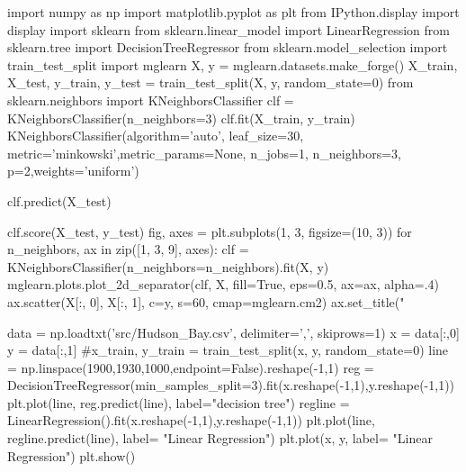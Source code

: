\documentclass[%
oneside,                 %
final,                   %
10pt]{article}
\begin{document}
\bpycod
import numpy as np
import matplotlib.pyplot as plt
from IPython.display import display
import sklearn
from sklearn.linear_model import LinearRegression
from sklearn.tree import DecisionTreeRegressor
from sklearn.model_selection import train_test_split
import mglearn
X, y = mglearn.datasets.make_forge()
X_train, X_test, y_train, y_test = train_test_split(X, y, random_state=0)
from sklearn.neighbors import KNeighborsClassifier
clf = KNeighborsClassifier(n_neighbors=3)
clf.fit(X_train, y_train)
KNeighborsClassifier(algorithm='auto', leaf_size=30, metric='minkowski',metric_params=None, n_jobs=1, n_neighbors=3, p=2,weights='uniform')

clf.predict(X_test)

clf.score(X_test, y_test)
fig, axes = plt.subplots(1, 3, figsize=(10, 3))
for n_neighbors, ax in zip([1, 3, 9], axes):
        clf = KNeighborsClassifier(n_neighbors=n_neighbors).fit(X, y)
        mglearn.plots.plot_2d_separator(clf, X, fill=True, eps=0.5, ax=ax, alpha=.4)
        ax.scatter(X[:, 0], X[:, 1], c=y, s=60, cmap=mglearn.cm2)
        ax.set_title("%


data = np.loadtxt('src/Hudson_Bay.csv', delimiter=',', skiprows=1)
x = data[:,0]
y = data[:,1]
#x_train,  y_train = train_test_split(x, y, random_state=0)
line = np.linspace(1900,1930,1000,endpoint=False).reshape(-1,1)
reg = DecisionTreeRegressor(min_samples_split=3).fit(x.reshape(-1,1),y.reshape(-1,1))
plt.plot(line, reg.predict(line), label="decision tree")
regline = LinearRegression().fit(x.reshape(-1,1),y.reshape(-1,1))
plt.plot(line, regline.predict(line), label= "Linear Regression")
plt.plot(x, y, label= "Linear Regression")
plt.show()

\epycod


\end{document}
